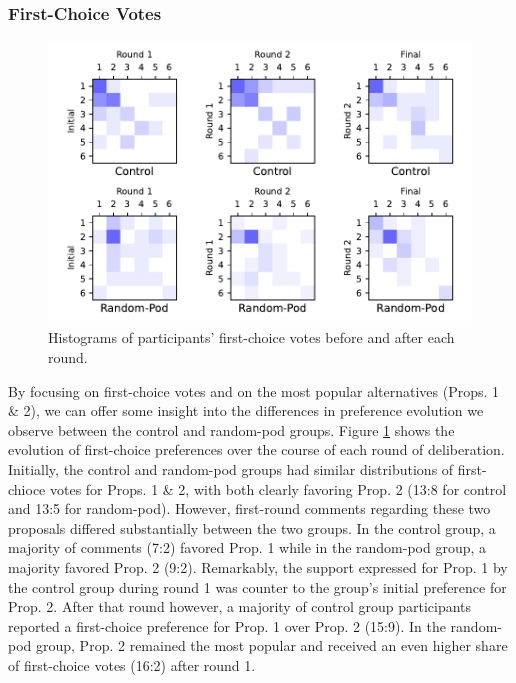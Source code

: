 {\subsubsection{First-Choice Votes}
\label{sec:res-firstchoice}

\begin{figure}
    \centering
    \includegraphics[width=6in]{chapters/figures/NetDelibExp/fig-round-matrix.pdf}
    \caption{Histograms of participants' first-choice votes before and after each round.}
    \label{fig:roundmatrix}
\end{figure}

By focusing on first-choice votes and on the most popular alternatives (Props. 1 \& 2), we can offer some insight into the differences in preference evolution we observe between the control and random-pod groups.
Figure \ref{fig:roundmatrix} shows the evolution of first-choice preferences over the course of each round of deliberation.
Initially, the control and random-pod groups had similar distributions of first-chioce votes for Props. 1 \& 2, with both clearly favoring Prop. 2 (13:8 for control and 13:5 for random-pod).
However, first-round comments regarding these two proposals differed substantially between the two groups.
In the control group, a majority of comments (7:2) favored Prop. 1 while in the random-pod group, a majority favored Prop. 2 (9:2).
Remarkably, the support expressed for Prop. 1 by the control group during round 1 was counter to the group's initial preference for Prop. 2.
After that round however, a majority of control group participants reported a first-choice preference for Prop. 1 over Prop. 2 (15:9).
In the random-pod group, Prop. 2 remained the most popular and received an even higher share of first-choice votes (16:2) after round 1.

}
